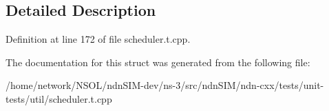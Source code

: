 \subsection{Detailed Description}


Definition at line 172 of file scheduler.\+t.\+cpp.



The documentation for this struct was generated from the following file\+:\begin{DoxyCompactItemize}
\item 
/home/network/\+N\+S\+O\+L/ndn\+S\+I\+M-\/dev/ns-\/3/src/ndn\+S\+I\+M/ndn-\/cxx/tests/unit-\/tests/util/scheduler.\+t.\+cpp\end{DoxyCompactItemize}
